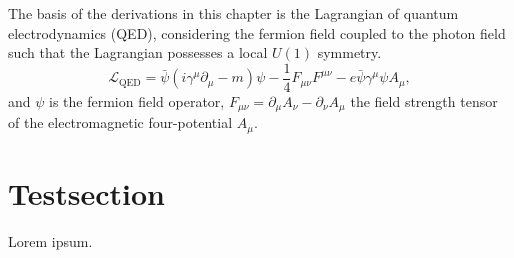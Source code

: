 The basis of the derivations in this chapter is the Lagrangian of quantum electrodynamics (QED), considering the fermion field coupled to the photon field such that the Lagrangian possesses a local $U(1)$ symmetry.
\begin{equation}
\mathcal{L}_{\text{QED}}=\bar{\psi}\left( i \gamma^\mu \partial_\mu -m  \right)\psi -\frac{1}{4}F_{\mu\nu}F^{\mu\nu}-e\bar{\psi}\gamma^\mu \psi A_\mu,
\end{equation}
and $\psi$ is the fermion field operator, $F_{\mu\nu}=\partial_\mu A_\nu - \partial_\nu A_\mu$ the field strength tensor of the electromagnetic four-potential $A_\mu$.
\newpage
\section{Testsection}
Lorem ipsum.






